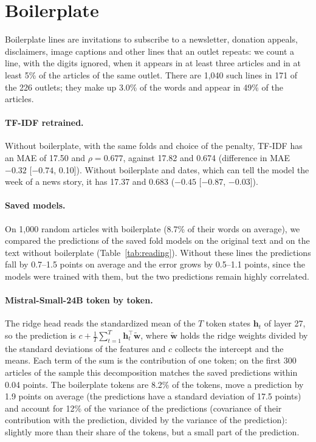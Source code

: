 \documentclass[11pt,a4paper]{article}
\begin{document}
\section{Boilerplate}\label{app:reading}
Boilerplate lines are invitations to subscribe to a newsletter, donation appeals, disclaimers, image captions and other
lines that an outlet repeats: we count a line, with the digits ignored, when it appears in at least three articles and
in at least 5\% of the articles of the same outlet. There are 1,040 such lines in 171 of the 226 outlets; they make up
3.0\% of the words and appear in 49\% of the articles.

\paragraph{TF-IDF retrained.} Without boilerplate, with the same folds and choice of the penalty, TF-IDF has an MAE of
17.50 and $\rho = 0.677$, against 17.82 and 0.674 (difference in MAE $-0.32$ [$-0.74$, 0.10]). Without boilerplate and
dates, which can tell the model the week of a news story, it has 17.37 and 0.683 ($-0.45$ [$-0.87$, $-0.03$]).

\paragraph{Saved models.} On 1,000 random articles with boilerplate (8.7\% of their words on average), we compared the
predictions of the saved fold models on the original text and on the text without boilerplate (Table~\ref{tab:reading}).
Without these lines the predictions fall by 0.7--1.5 points on average and the error grows by 0.5--1.1 points, since
the models were trained with them, but the two predictions remain highly correlated.

\paragraph{Mistral-Small-24B token by token.} The ridge head reads the standardized mean of the $T$ token states
$\mathbf{h}_t$ of layer 27, so the prediction is $c + \frac{1}{T}\sum_{t=1}^{T}\mathbf{h}_t^\top\tilde{\mathbf{w}}$,
where $\tilde{\mathbf{w}}$ holds the ridge weights divided by the standard deviations of the features and $c$ collects
the intercept and the means. Each term of the sum is the contribution of one token; on the first 300 articles of the
sample this decomposition matches the saved predictions within 0.04 points. The boilerplate tokens are 8.2\% of the
tokens, move a prediction by 1.9 points on average (the predictions have a standard deviation of 17.5 points) and
account for 12\% of the variance of the predictions (covariance of their contribution with the prediction, divided by
the variance of the prediction): slightly more than their share of the tokens, but a small part of the prediction.
\end{document}
